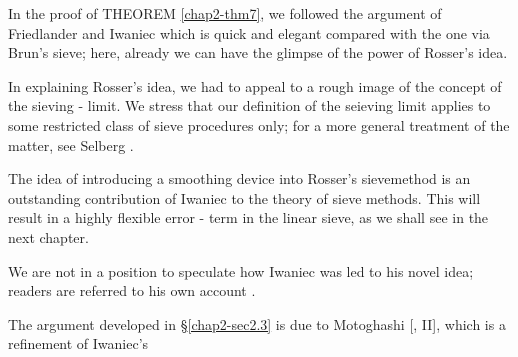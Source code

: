 In the proof of THEOREM \ref{chap2-thm7}, we followed the argument of
Friedlander 
and Iwaniec \cite{key14} which is quick and elegant compared with the one
via Brun's sieve; here, already we can have the glimpse of the power
of Rosser's idea. 

In explaining Rosser's idea, we had to appeal to a rough image of the
concept of the sieving - limit. We stress that our definition of the
seieving limit applies to some restricted class of sieve procedures
only; for a more general treatment of the matter, see Selberg \cite{key75}. 

The idea of introducing a smoothing device into Rosser's sieve\break method
is an outstanding contribution of Iwaniec \cite{key31} to the theory of
sieve methods. This will result in a highly flexible error - term in
the linear sieve, as we shall see in the next chapter. 

We are not in a position to speculate how Iwaniec was led to his novel
idea; readers are referred to his own account \cite{key33}. 

The argument developed in \S \ref{chap2-sec2.3} is due to Motoghashi
[\cite{key60}, II],\break 
which is a refinement of Iwaniec's 
